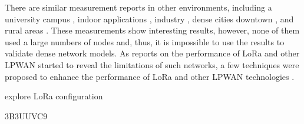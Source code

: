 




There are similar measurement reports in other environments,
	including a university campus \cite{wang_performance_2017},
	indoor applications \cite{neumann_indoor_2016},
	industry \cite{angrisani_lora_2017},
	dense cities downtown \cite{jorke_urban_2017},
	and rural areas \cite{oliveira_long_2017}.
These measurements show interesting results,
	however,
	none of them used a large numbers of nodes and,
	thus,
	it is impossible to use the results to validate dense network models.
As reports on the performance of LoRa and other LPWAN started to reveal the limitations of such networks,
	a few techniques were proposed to enhance the performance of LoRa \cite{cuomo_explora_2017} \cite{bor_lora_2017}\cite{qin_resource_2017} and other LPWAN technologies \cite{mo_optimization_2016}\cite{song_evaluation_2017}\cite{magrin_performance_2017}.


\citet{bor_lora_2017} explore LoRa configuration

\cite{marais_lora_2017} 3B3UUVC9

